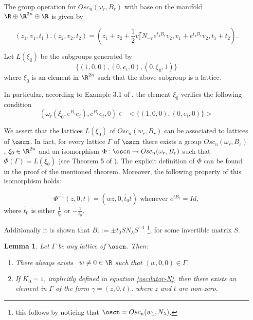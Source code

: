 \documentclass[12pt]{amsart}
\theoremstyle{plain}
\newtheorem{lem}[thm]{Lemma}
\theoremstyle{definition}
\theoremstyle{remark}
\begin{document}
	The group operation for $Osc_n(\omega_r, B_r)$ with base on the manifold $\R \oplus \R^{2n} \oplus \R$ is given by
	
	\begin{equation}
		(z_1,v_1,t_1) . (z_2,v_2,t_2)=(z_1+z_2+\frac{1}{2}v_1^{T}N_{-r} e^{t_1 B_r}v_2,v_1+e^{t_1 B_r}v_2,t_1+t_2).
	\end{equation}
	
	Let $L(\xi_0)$ be the subgroups generated by $$\{ (1,0,0),(0,e_i,0),(0,\xi_0, 1) \}$$ where $\xi_0$ is an element in $\R^{2n}$ such that the above subgroup is a lattice. 
	
In particular, according to Example 3.1 of \cite{MF}, the element $\xi_0$ verifies the following condition 
	\begin{equation}\label{xi-condition}
		(\omega_r(\xi_0, e^{B_r}e_i), e^{B_r} e_i, 0) \in \,\, <\{ (1,0,0),(0,e_i,0) \}>
	\end{equation}
	
	
We assert that  the lattices $L(\xi_0)$ of $Osc_n(w_r, B_r)$ can be associated to lattices of $\oscn$. In fact, for every lattice $\Gamma$ of $\oscn$ there exists a group $Osc_n(\omega_r, B_r)$, $\xi_0 \in \R^{2n}$ and an isomorphism $\Phi: \oscn \rightarrow Osc_n(\omega_r, B_r)$ such that $\Phi(\Gamma) = L(\xi_0)$ (see Theorem 5 of \cite{MF}). 	
	The explicit definition of $\Phi$ can be found in the proof of the mentioned theorem. Moreover, the following property of this isomorphism holds:
	
	\begin{equation} \label{condition-exp}
		\Phi^{-1}(z,0,t) = (w z, 0, \widetilde{t_0} t ) \mbox{ whenever } e^{t B_r} = Id,
		\end{equation}
    where $\widetilde{t_0}$ is either $\frac{1}{t_0}$ or $-\frac{1}{t_0}$.

	Additionally it is shown that $B_r := \pm t_0 S N_{\lambda} S^{-1}$ \footnote{this follows by  noticing that $\oscn = Osc_n(w_{1}, N_{\lambda})$.}, for some invertible matrix $S$. 
	
	\begin{lem}\cite{MF}\label{oscilador-elementos}  %
		Let $\Gamma$ be any lattice of $\oscn$. Then:
		\begin{enumerate}
			\item There always exists \, $w \neq 0 \in \R$ such that $(w,0,0) \in \Gamma$.
			\item If $K_0=1$, implicitly defined in equation \ref{oscilator-N}, then there exists an element in $\Gamma$ of the form $\gamma = (z, 0, t)$, where $z$ and $t$ are non-zero.
		\end{enumerate}
	\end{lem} 
	
\end{document}

